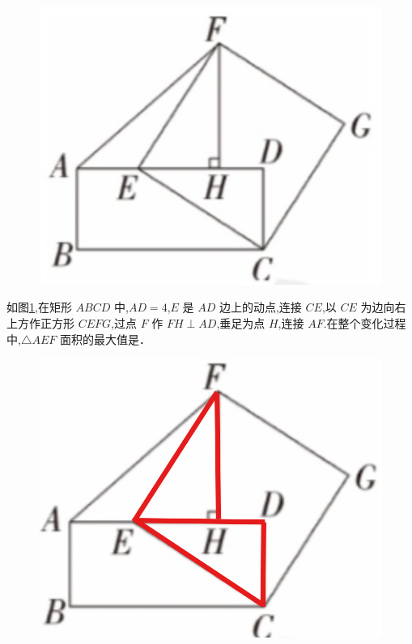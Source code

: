 \begin{figure}
\vspace{-1.8cm}
    \includegraphics[width=1\linewidth]{figure/p5.png}
    \caption{}
    \label{fig:p5}
\end{figure}


\begin{example}
    如图\ref{fig:p5},在矩形 \(ABCD\) 中,\(AD=4\),\(E\) 是 \(AD\) 边上的动点,连接 \(CE\),以 \(CE\) 为边向右上方作正方形 \(CEFG\),过点 \(F\) 作 \(FH \perp AD\),垂足为点 \(H\),连接 \(AF\).在整个变化过程中,\(\triangle AEF\) 面积的最大值是\underline{\hspace{3.5em}}．
\end{example}

\begin{figure}
    \includegraphics[width=1\linewidth]{figure/p5-1.png}
    \caption{}
    \label{fig:p5_1}
\end{figure}

